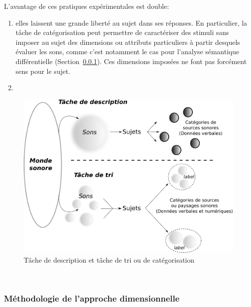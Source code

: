 L'avantage de ces pratiques expérimentales est double:

\begin{enumerate}

\item  elles laissent une grande liberté au sujet dans ses réponses. En particulier, la tâche de catégorisation peut permettre de caractériser des stimuli sans imposer au sujet des dimensions ou attributs particuliers à partir desquels évaluer les sons, comme c'est notamment le cas pour l'analyse sémantique différentielle (\cf Section~\ref{sec:appDimensionelle}). Ces dimensions imposées ne font pas forcément sens pour le sujet. 

\item {}

\end{enumerate}

\begin{figure}[t]
        \myfloatalign
        \includegraphics[width=.8\linewidth]{gfx/desCat}
        \caption{Tâche de description et tâche de tri ou de catégorisation}\label{fig:descat}
\end{figure}

 \\

\subsubsection{Méthodologie de l'approche dimensionnelle}
\label{sec:appDimensionelle}

